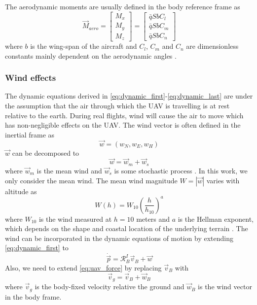 The aerodynamic moments are usually defined in the body reference frame as
\begin{equation}\label{eq:dynamic_last}
    \vec{M}_{aero}=
    \begin{bmatrix}
        M_x \\
        M_y \\
        M_z
    \end{bmatrix}=
    \begin{bmatrix}
        \bar{q}SbC_l \\
        \bar{q}SbC_m \\
        \bar{q}SbC_n
    \end{bmatrix}
\end{equation}
where $b$ is the wing-span of the aircraft and $C_l$, $C_m$ and $C_n$ are dimensionless 
constants mainly dependent on the aerodynamic angles \cite{uav_dynamics_wind}. \\

\subsubsection{Wind effects}
The dynamic equations derived in \eqref{eq:dynamic_first}-\eqref{eq:dynamic_last} are under
the assumption that the air through which the UAV is travelling is at rest relative to the earth.
During real flights, wind will cause the air to move which has non-negligible effects on the UAV.
The wind vector is often defined in the inertial frame as
\begin{equation}
    \vec{w}=(w_N, w_E, w_H)
\end{equation}
$\vec{w}$ can be decomposed to
\begin{equation}
    \vec{w}=\vec{w}_{m}+\vec{w}_s
\end{equation}
where $\vec{w}_m$ is the mean wind and $\vec{w}_s$ is some stochastic process \cite{spline_trajectory}. In this work,
we only consider the mean wind.
The mean wind magnitude $W=|\vec{w}|$ varies with altitude as
\begin{equation}
    W(h)=W_{10}(\frac{h}{h_{10}})^a
\end{equation}
where $W_{10}$ is the wind measured at $h=10$ meters and $a$ is the Hellman exponent, which depends on
the shape and coastal location of the underlying terrain \cite{uav_dynamics_wind}. The wind can be 
incorporated in the dynamic equations of motion by extending \eqref{eq:dynamic_first} to
\begin{equation}
    \dot{\vec{p}}=\mathcal{R}^I_B\vec{v}_B+\vec{w}
\end{equation}
Also, we need to extend \eqref{eq:uav_force} by replacing $\vec{v}_B$ with
\begin{equation}
    \vec{v}_g = \vec{v}_B + \vec{w}_B
\end{equation} 
where $\vec{v}_g$ is the body-fixed velocity relative the ground and $\vec{w}_B$ is the
wind vector in the body frame.

